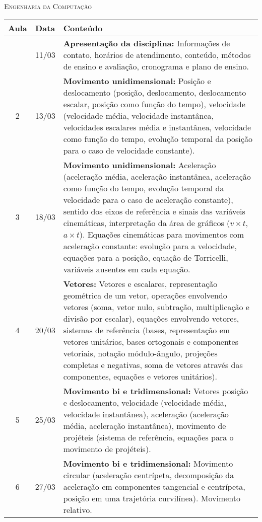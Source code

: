 \vspace{1cm}
\begin{center}
\Large\textsc{Engenharia da Computação}
\end{center}
\begin{center}
\begin{longtable}{ccp{70mm}}
\toprule
Aula & Data & Conteúdo \\
\midrule
\endhead
\bottomrule
\endfoot
  1 & 11/03 & \textbf{Apresentação da disciplina:} Informações de contato, horários de atendimento, conteúdo, métodos de ensino e avaliação, cronograma e plano de ensino. \\
  2 & 13/03 & \textbf{Movimento unidimensional:} Posição e deslocamento (posição, deslocamento, deslocamento escalar, posição como função do tempo), velocidade (velocidade média, velocidade instantânea, velocidades escalares média e instantânea, velocidade como função do tempo, evolução temporal da posição para o caso de velocidade constante). \\
  3 & 18/03 & \textbf{Movimento unidimensional:} Aceleração (aceleração média, aceleração instantânea, aceleração como função do tempo, evolução temporal da velocidade para o caso de aceleração constante), sentido dos eixos de referência e sinais das variáveis cinemáticas, interpretação da área de gráficos ($v \times t$, $a \times  t$). Equações cinemáticas para movimentos com aceleração constante: evolução para a velocidade, equações para a posição, equação de Torricelli, variáveis ausentes em cada equação. \\
  4 & 20/03 & \textbf{Vetores:} Vetores e escalares, representação geométrica de um vetor, operações envolvendo vetores (soma, vetor nulo, subtração, multiplicação e divisão por escalar), equações envolvendo vetores, sistemas de referência (bases, representação em vetores unitários, bases ortogonais e componentes vetoriais, notação módulo-ângulo, projeções completas e negativas, soma de vetores através das componentes, equações e vetores unitários). \\
  5 & 25/03 & \textbf{Movimento bi e tridimensional:} Vetores posição e deslocamento, velocidade (velocidade média, velocidade instantânea), aceleração (aceleração média, aceleração instantânea), movimento de projéteis (sistema de referência, equações para o movimento de projéteis). \\
  6 & 27/03 & \textbf{Movimento bi e tridimensional:} Movimento circular (aceleração centrípeta, decomposição da aceleração em componentes tangencial e centrípeta, posição em uma trajetória curvilínea). Movimento relativo. \\

\end{longtable}
\end{center}
